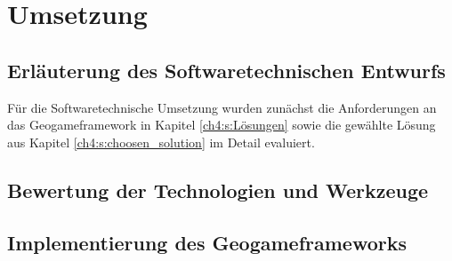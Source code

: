\chapter{Umsetzung}
\label{ch:S5_Umsetzung}

\section{Erläuterung des Softwaretechnischen Entwurfs}

Für die Softwaretechnische Umsetzung wurden zunächst die Anforderungen an das Geogameframework in Kapitel \ref{ch4:s:Lösungen} sowie die gewählte Lösung aus Kapitel \ref{ch4:s:choosen_solution} im Detail evaluiert.

\section{Bewertung der Technologien und Werkzeuge}

\section{Implementierung des Geogameframeworks}